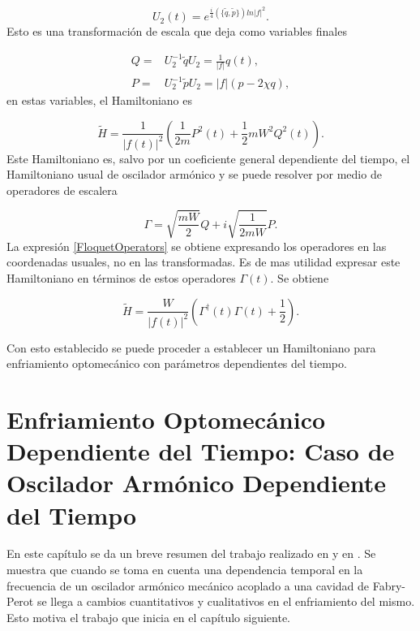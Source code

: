 \documentclass[10pt,a4paper]{report}
\begin{document}
\begin{equation}
U_2(t)=e^{\frac{i}{4}(\{\tilde{q},\tilde{p}\})ln|f|^2}.
\end{equation}Esto es una transformación de escala que deja como variables finales

\begin{align}
Q=&U_2^{-1}\tilde{q}U_2 =\frac{1}{|f|}q(t),\\
P=&U_2^{-1}\tilde{p}U_2 = |f|(p-2\chi q), 
\end{align} en estas variables, el Hamiltoniano es

\begin{equation}\label{QTDHO}
\tilde{H} = \frac{1}{|f(t)|^2}(\frac{1}{2m}P^2(t)+\frac{1}{2}mW^2Q^2(t)).
\end{equation}Este Hamiltoniano es, salvo por un coeficiente general dependiente del tiempo, el Hamiltoniano usual de oscilador armónico y se puede resolver por medio de operadores de escalera

\begin{equation}
\Gamma = \sqrt{\frac{mW}{2}}Q + i \sqrt{\frac{1}{2mW}}P.
\end{equation} La expresión \eqref{FloquetOperators} se obtiene expresando los operadores en las coordenadas usuales, no en las transformadas. Es de mas utilidad expresar este Hamiltoniano en términos de estos operadores $\Gamma(t)$. Se obtiene

\begin{equation}
\tilde{H} = \frac{W}{|f(t)|^2}(\Gamma^\dagger(t)\Gamma(t) + \frac{1}{2}).
\end{equation}

Con esto establecido se puede proceder a establecer un Hamiltoniano para enfriamiento optomecánico con parámetros dependientes del tiempo.

\chapter{Enfriamiento Optomecánico Dependiente del Tiempo: Caso de Oscilador Armónico Dependiente del Tiempo}

En este capítulo se da un breve resumen del trabajo realizado en \cite{TesisMaestria} y en \cite{YanesOC}. Se muestra que  cuando se toma en cuenta una dependencia temporal en la frecuencia  de un oscilador armónico mecánico acoplado a una cavidad de Fabry-Perot se llega a cambios cuantitativos y cualitativos en el enfriamiento del mismo. Esto motiva el trabajo que inicia en el capítulo siguiente.
\end{document}
